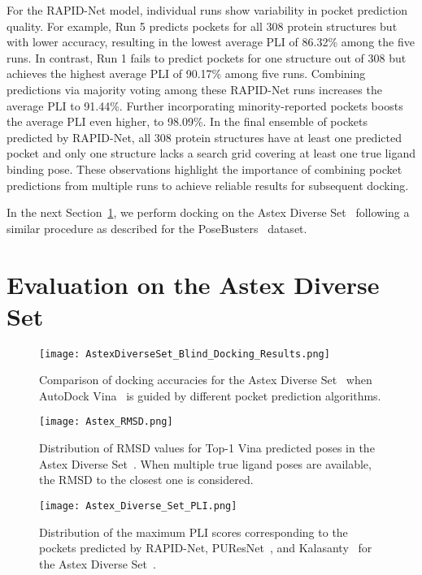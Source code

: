 \documentclass[10pt,conference]{IEEEtran}
\begin{document}
For the RAPID-Net model, individual runs show variability in pocket prediction quality. For example, Run 5 predicts pockets for all 308 protein structures but with lower accuracy, resulting in the lowest average PLI of 86.32\% among the five runs. In contrast, Run 1 fails to predict pockets for one structure out of 308 but achieves the highest average PLI of 90.17\% among five runs. Combining predictions via majority voting among these RAPID-Net runs increases the average PLI to 91.44\%. Further incorporating minority-reported pockets boosts the average PLI even higher, to 98.09\%. In the final ensemble of pockets predicted by RAPID-Net, all 308 protein structures have at least one predicted pocket and only one structure lacks a search grid covering at least one true ligand binding pose. These observations highlight the importance of combining pocket predictions from multiple runs to achieve reliable results for subsequent docking.

In the next Section~\ref{Astex_Evaluation}, we perform docking on the Astex Diverse Set~\cite{hartshorn2007diverse} following a similar procedure as described for the PoseBusters~\cite{Buttenschoen2024} dataset. 



\section{Evaluation on the Astex Diverse Set}
\label{Astex_Evaluation}

\begin{figure}[h]{}
\texttt{[image: AstexDiverseSet\_Blind\_Docking\_Results.png]}
\caption{Comparison of docking accuracies for the Astex Diverse Set~\cite{hartshorn2007diverse} when AutoDock Vina~\cite{eberhardt2021autodock} is guided by different pocket prediction algorithms.}
\label{Astex_Blind_Docking_Results_Fig}
\end{figure}

\begin{figure}[]{}
\texttt{[image: Astex\_RMSD.png]}
  \caption{Distribution of RMSD values for Top-1 Vina predicted poses in the Astex Diverse Set~\cite{Buttenschoen2024}. When multiple true ligand poses are available, the RMSD to the closest one is considered.}
\label{Astex_RMSD_Fig}
\end{figure}


\begin{figure}[]{}
\texttt{[image: Astex\_Diverse\_Set\_PLI.png]}
  \caption{Distribution of the maximum PLI scores corresponding to the pockets predicted by RAPID-Net, PUResNet~\cite{kandel2021puresnet}, and Kalasanty~\cite{stepniewska2020improving} for the Astex Diverse Set~\cite{hartshorn2007diverse}.}
\label{Astex_PLI_Fig}
\end{figure}
\end{document}
